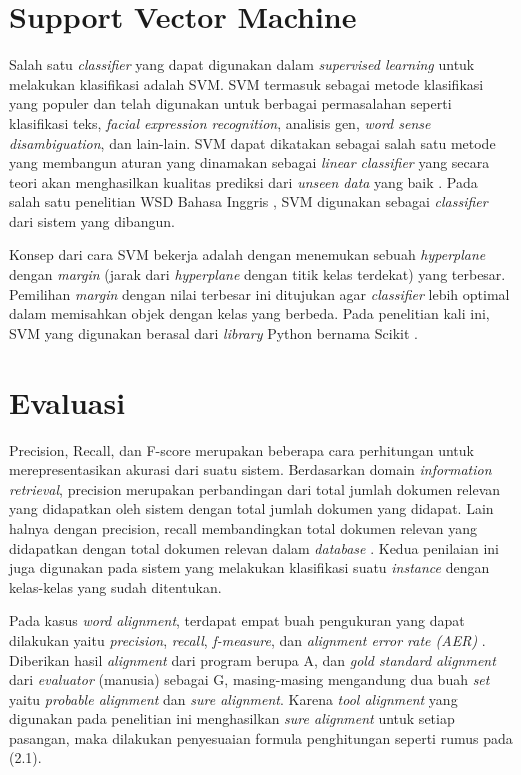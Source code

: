 \section{Support Vector Machine}
Salah satu \textit{classifier} yang dapat digunakan dalam \textit{supervised learning} untuk melakukan klasifikasi adalah SVM. SVM termasuk sebagai metode klasifikasi yang populer dan telah digunakan untuk berbagai permasalahan seperti klasifikasi teks, \textit{facial expression recognition}, analisis gen, \textit{word sense disambiguation}, dan lain-lain. SVM dapat dikatakan sebagai salah satu metode yang membangun aturan yang dinamakan sebagai \textit{linear classifier} yang secara teori akan menghasilkan kualitas prediksi dari \textit{unseen data} yang baik \citep{fradkin2006support}. Pada salah satu penelitian WSD Bahasa Inggris \citep{zhong2010makes}, SVM digunakan sebagai \textit{classifier} dari sistem yang dibangun.

Konsep dari cara SVM bekerja adalah dengan menemukan sebuah \textit{hyperplane} dengan \textit{margin} (jarak dari \textit{hyperplane} dengan titik kelas terdekat) yang terbesar. Pemilihan \textit{margin} dengan nilai terbesar ini ditujukan agar \textit{classifier} lebih optimal dalam memisahkan objek dengan kelas yang berbeda. Pada penelitian kali ini, SVM yang digunakan berasal dari \textit{library} Python bernama Scikit \citep{scikit-learn}.

\section{Evaluasi}

Precision, Recall, dan F-score merupakan beberapa cara perhitungan untuk merepresentasikan akurasi dari suatu sistem. Berdasarkan domain \textit{information retrieval}, precision merupakan perbandingan dari total jumlah dokumen relevan yang didapatkan oleh sistem dengan total jumlah dokumen yang didapat. Lain halnya dengan precision, recall membandingkan total dokumen relevan yang didapatkan dengan total dokumen relevan dalam \textit{database} \citep{ting2011precision}. Kedua penilaian ini juga digunakan pada sistem yang melakukan klasifikasi suatu \textit{instance} dengan kelas-kelas yang sudah ditentukan.

Pada kasus \textit{word alignment}, terdapat empat buah pengukuran yang dapat dilakukan yaitu \textit{precision}, \textit{recall}, \textit{f-measure}, dan \textit{alignment error rate (AER)} \citep{mihalcea2003evaluation}. Diberikan hasil \textit{alignment} dari program berupa A, dan \textit{gold standard alignment} dari \textit{evaluator} (manusia) sebagai G, masing-masing mengandung dua buah \textit{set} yaitu \textit{probable alignment} dan \textit{sure alignment}. Karena \textit{tool alignment} yang digunakan pada penelitian ini menghasilkan \textit{sure alignment} untuk setiap pasangan, maka dilakukan penyesuaian formula penghitungan seperti rumus pada (2.1).

